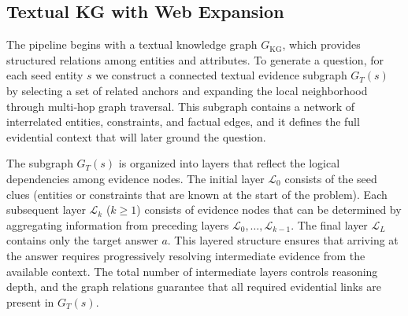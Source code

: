 \documentclass[11pt]{article}
\newcommand{\modelname}{\textsc{UniBrowse}}
\begin{document}

\subsection{Textual KG with Web Expansion} 
\label{sec:text-skeleton}

The pipeline begins with a textual knowledge graph $G_{\mathrm{KG}}$, which provides structured relations among entities and attributes.
To generate a question, for each seed entity $s$ we construct a connected textual evidence subgraph $G_T(s)$ by selecting a set of related anchors and expanding the local neighborhood through multi‑hop graph traversal. This subgraph contains a network of interrelated entities, constraints, and factual edges, and it defines the full evidential context that will later ground the question.

The subgraph $G_T(s)$ is organized into layers that reflect the logical dependencies among evidence nodes.
The initial layer $\mathcal{L}_0$ consists of the seed clues (entities or constraints that are known at the start of the problem).
Each subsequent layer $\mathcal{L}_k$ ($k \ge 1$) consists of evidence nodes that can be determined by aggregating information from preceding layers $\mathcal{L}_0, \dots, \mathcal{L}_{k-1}$.
The final layer $\mathcal{L}_L$ contains only the target answer $a$.
This layered structure ensures that arriving at the answer requires progressively resolving intermediate evidence from the available context.
The total number of intermediate layers controls reasoning depth, and the graph relations guarantee that all required evidential links are present in $G_T(s)$.
\end{document}
